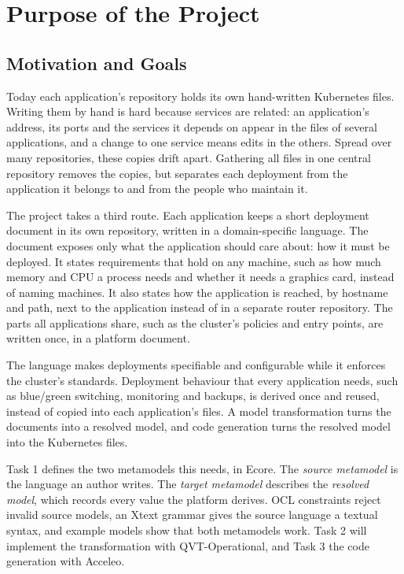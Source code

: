 \section{Purpose of the Project}
\label{sec:introduction}

\subsection{Motivation and Goals}

Today each application's repository holds its own hand-written Kubernetes
files. Writing them by hand is hard because services are related: an
application's address, its ports and the services it depends on appear in the
files of several applications, and a change to one service means edits in the
others. Spread over many repositories, these copies drift apart. Gathering all
files in one central repository removes the copies, but separates each
deployment from the application it belongs to and from the people who
maintain it.

The project takes a third route. Each application keeps a short deployment
document in its own repository, written in a domain-specific language. The
document exposes only what the application should care about: how it must be
deployed. It states requirements that hold on any machine, such as how much
memory and CPU a process needs and whether it needs a graphics card, instead of
naming machines. It also states how the application is reached, by hostname and
path, next to the application instead of in a separate router repository. The
parts all applications share, such as the cluster's policies and entry points,
are written once, in a platform document.

The language makes deployments specifiable and configurable while it enforces
the cluster's standards. Deployment behaviour that every application needs,
such as blue/green switching, monitoring and backups, is derived once and
reused, instead of copied into each application's files. A model
transformation turns the documents into a resolved model, and code generation
turns the resolved model into the Kubernetes files.

Task 1 defines the two metamodels this needs, in Ecore. The \emph{source
metamodel} is the language an author writes. The \emph{target metamodel}
describes the \emph{resolved model}, which records every value the platform
derives. OCL constraints reject invalid source models, an Xtext grammar gives
the source language a textual syntax, and example models show that both
metamodels work. Task 2 will implement the transformation with
QVT-Operational, and Task 3 the code generation with Acceleo.

